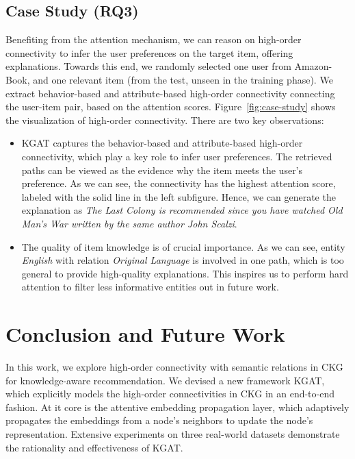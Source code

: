 \documentclass[sigconf]{acmart}
\theoremstyle{definition}
\begin{document}
\subsection{Case Study (RQ3)}\label{sec:visualization}
Benefiting from the attention mechanism, we can reason on high-order connectivity to infer the user preferences on the target item, offering explanations.
Towards this end, we randomly selected one user  from Amazon-Book, and one relevant item  (from the test, unseen in the training phase).
We extract behavior-based and attribute-based high-order connectivity connecting the user-item pair, based on the attention scores.
Figure~\ref{fig:case-study} shows the visualization of high-order connectivity. There are two key observations:
\begin{itemize}[leftmargin=*]
    \item KGAT captures the behavior-based and attribute-based high-order connectivity, which play a key role to infer user preferences.
    The retrieved paths can be viewed as the evidence why the item meets the user's preference. As we can see, the connectivity  has the highest attention score, labeled with the solid line in the left subfigure.
    Hence, we can generate the explanation as \emph{The Last Colony is recommended since you have watched Old Man's War written by the same author John Scalzi}.
    
    \item The quality of item knowledge is of crucial importance. As we can see, entity \emph{English} with relation \emph{Original Language} is involved in one path, which is too general to provide high-quality explanations. This inspires us to perform hard attention to filter less informative entities out in future work. 
\end{itemize}














%
 \section{Conclusion and Future Work}

In this work, we explore high-order connectivity with semantic relations in CKG for knowledge-aware recommendation.
We devised a new framework KGAT, which explicitly models the high-order connectivities in CKG in an end-to-end fashion.
At it core is the attentive embedding propagation layer, which adaptively propagates the embeddings from a node's neighbors to update the node's representation.
Extensive experiments on three real-world datasets demonstrate the rationality and effectiveness of KGAT.
\end{document}
